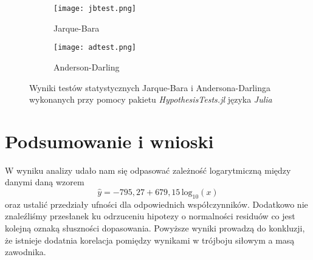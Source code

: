 \documentclass{article}
\begin{document}
\begin{figure}[!htb]
\centering
\begin{subfigure}{.5\textwidth}
  \centering
  \texttt{[image: jbtest.png]}
  \caption{Jarque-Bara}
  \label{fig:jb}
\end{subfigure}%
\begin{subfigure}{.5\textwidth}
  \centering
  \texttt{[image: adtest.png]}
  \caption{Anderson-Darling}
  \label{fig:ad}
\end{subfigure}
\caption{Wyniki testów statystycznych Jarque-Bara i Andersona-Darlinga wykonanych przy pomocy pakietu \textit{HypothesisTests.jl} języka \textit{Julia}}
\label{fig:testy}
\end{figure}


\section{Podsumowanie i wnioski}
W wyniku analizy udało nam się odpasować zależność logarytmiczną między danymi daną wzorem
$$ \hat{y} = -795,27 + 679,15\, \text{log}_{10}(x)$$ oraz ustalić przedziały ufności dla odpowiednich współczynników. Dodatkowo nie znaleźliśmy przesłanek ku odrzuceniu hipotezy o normalności residuów co jest kolejną oznaką słuszności dopasowania. Powyższe wyniki prowadzą do konkluzji, że istnieje dodatnia korelacja pomiędzy wynikami w trójboju siłowym a masą zawodnika. 
\end{document}
